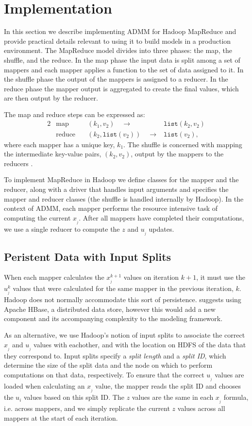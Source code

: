 \documentclass[10pt, conference, compsocconf]{IEEEtran}
\begin{document}
\section{Implementation}\label{sec:imp}
In this section we describe implementing ADMM for Hadoop MapReduce and provide practical details relevant to using it to build models in a production environment.  The MapReduce model divides into three phases: the map, the shuffle, and the reduce.  In the map phase the input data is split among a set of mappers and each mapper applies a function to the set of data assigned to it.  In the shuffle phase the output of the mappers is assigned to a reducer.  In the reduce phase the mapper output is aggregated to create the final values, which are then output by the reducer.

The map and reduce steps can be expressed as:
\begin{alignat*}{2}
&\text{map}\quad &(k_1,v_2)\quad\rightarrow &\texttt{list}(k_2,v_2)\\
&\text{reduce}\quad &(k_2,\texttt{list}(v_2))\quad\rightarrow &\texttt{list}(v_2),
\end{alignat*}
where each mapper has a unique key, $k_1$.  The shuffle is concerned with mapping the intermediate key-value pairs, $(k_2,v_2)$, output by the mappers to the reducers \cite{dean2004}.

To implement MapReduce in Hadoop we define classes for the mapper and the reducer, along with a driver that handles input arguments and specifies the mapper and reducer classes (the shuffle is handled internally by Hadoop).  In the context of ADMM, each mapper performs the resource intensive task of computing the current $x_{_j}$.  After all mappers have completed their computations, we use a single reducer to compute the $z$ and $u_{_j}$ updates.

\subsection{Peristent Data with Input Splits}
When each mapper calculates the $x_{_j}^{k+1}$ values on iteration $k+1$, it must use the $u_{_j}^k$ values that were calculated for the same mapper in the previous iteration, $k$.  Hadoop does not normally accommodate this sort of persistence.  \cite{boyd} suggests using Apache HBase, a distributed data store, however this would add a new component and its accompanying complexity to the modeling framework.

As an alternative, we use Hadoop's notion of input splits to associate the correct $x_{_j}$ and $u_{_j}$ values with eachother, and with the location on HDFS of the data that they correspond to.  Input splits specify a \emph{split length} and a \emph{split ID}, which determine the size of the split data and the node on which to perform computations on that data, respectively.  To ensure that the correct $u_{_j}$ values are loaded when calculating an $x_{_j}$ value, the mapper reads the split ID and chooses the $u_i$ values based on this split ID.  The $z$ values are the same in each $x_{_j}$ formula, i.e. across mappers, and we simply replicate the current $z$ values across all mappers at the start of each iteration.
\end{document}
